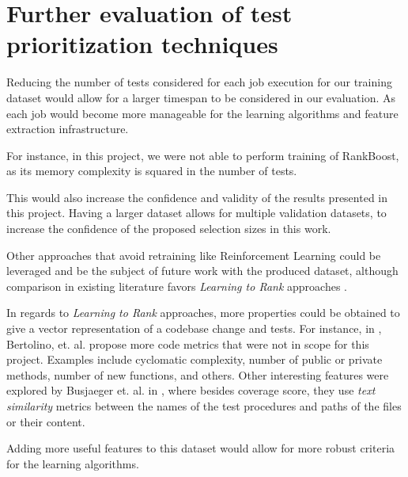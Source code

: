 \section{Further evaluation of test prioritization techniques}\label{s:future-evalp}
Reducing the number of tests considered for each job execution for our training
dataset would allow for a larger timespan to be considered in our evaluation.
As each job would become more manageable for the learning algorithms and feature
extraction infrastructure. 

For instance, in this project, we were not able
to perform training of RankBoost, as its memory complexity is squared in the
number of tests.

This would also increase the confidence and validity of the results presented in this 
project. Having a larger dataset allows for multiple validation datasets, to increase the
confidence of the proposed selection sizes in this work.

Other approaches that avoid retraining like Reinforcement Learning could be 
leveraged and be the subject of future work with the produced dataset, although
comparison in existing literature favors \emph{Learning to Rank} approaches \cite{Bertolino2020LearningtoRankVR}.

In regards to \emph{Learning to Rank} approaches, more properties could be
obtained to give a vector representation of a codebase change and tests. 
For instance, in \cite{Bertolino2020LearningtoRankVR}, Bertolino, et. al. propose more 
code metrics that were not in scope for this project. Examples include 
cyclomatic complexity, number of public or private methods, number of 
new functions, and others. Other interesting features were explored by Busjaeger et. al. in \cite{Busjaeger2016LearningFT}, 
where besides coverage score, they use \emph{text similarity} metrics between the 
names of the test procedures and paths of the files or their content. 

Adding more useful features to this dataset would allow for more
robust criteria for the learning algorithms.